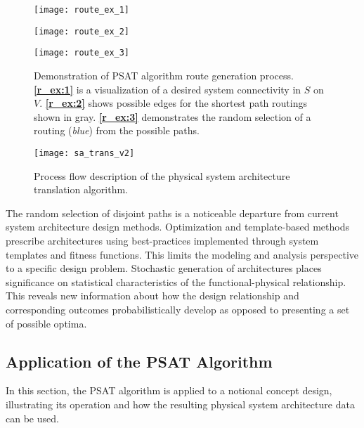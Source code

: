 \documentclass[preprint,12pt]{elsarticle}
\begin{document}
\begin{figure*}[t]
	\begin{minipage}{.33\linewidth}
		\centering
		\texttt{[image: route\_ex\_1]}
		\label{r_ex:1}
	\end{minipage}%
	\begin{minipage}{.33\linewidth}
		\centering
		\texttt{[image: route\_ex\_2]}
		\label{r_ex:2}
	\end{minipage}%
	\begin{minipage}{.33\linewidth}
		\centering
		\texttt{[image: route\_ex\_3]}
		\label{r_ex:3}
	\end{minipage}
	
	\caption{Demonstration of PSAT algorithm route generation process. \textbf{\ref{r_ex:1}} is a visualization of a desired system connectivity in $S$ on $V$. \textbf{\ref{r_ex:2}} shows possible edges for the shortest path routings shown in gray. \textbf{\ref{r_ex:3}} demonstrates the random selection of a routing (\textit{blue}) from the possible paths.}
	\label{fig:r_ex}
\end{figure*}


\begin{figure}
	\centering
	\texttt{[image: sa\_trans\_v2]}
	\caption{Process flow description of the physical system architecture translation algorithm. }
	\label{fig:satrans}
\end{figure}


The random selection of disjoint paths is a noticeable departure from current system architecture design methods. Optimization and template-based methods prescribe architectures using best-practices implemented through system templates and fitness functions. This limits the modeling and analysis perspective to a specific design problem. Stochastic generation of architectures places significance on statistical characteristics of the functional-physical relationship. This reveals new information about how the design relationship and corresponding outcomes probabilistically develop as opposed to presenting a set of possible optima.

\subsection{Application of the PSAT Algorithm} \label{sec:application}
In this section, the PSAT algorithm is applied to a notional concept design, illustrating its operation and how the resulting physical system architecture data can be used. 
\end{document}
